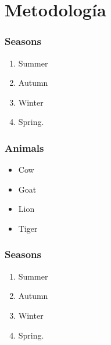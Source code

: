 \documentclass[12pt, aspectratio = 169]{beamer}
\begin{document}
    \section{Metodología}
        \begin{frame}[t]
            \frametitle{Seasons}
            \begin{enumerate}[<+->]
                \item Summer
                \item Autumn
                \item Winter
                \item Spring.
            \end{enumerate}
        \end{frame}
        \begin{frame}[<+->][t]
            \frametitle{Animals}
            \begin{itemize}
                \item Cow
                \item Goat
            \end{itemize}
            \begin{itemize}
                \item Lion
                \item Tiger
            \end{itemize}
        \end{frame}
        \begin{frame}[t]
            \frametitle{Seasons}
            \begin{enumerate}[<+-|alert@+>]
                \item Summer
                \item Autumn
                \item Winter
                \item Spring.
            \end{enumerate}
        \end{frame}
\end{document}
